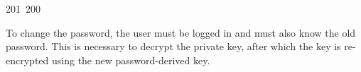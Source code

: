 201~200~\documentclass{article}
\begin{document}
	                                                                                                                                        To change the password, the user must be logged in and must also know the old password. This is necessary to decrypt the private key, after which the key is re-encrypted using the new password-derived key.

	                                                                                                                                        \begin{lstlisting}[language=Python, caption=Change Password]

	                                                                                                                                        def modify_password(user: User):
	                                                                                                                                            """
	                                                                                                                                                \brief Modify the password of a user.
	                                                                                                                                                    \param user The user whose password is to be modified.
	                                                                                                                                                        """
	                                                                                                                                                            old_password = get_input("Enter your old password")
	                                                                                                                                                                user_key = crypto.derive_user_key_from_password(user.username, old_password)
	                                                                                                                                                                    hashed_password = crypto.hash_user_key(user_key)

	                                                                                                                                                                        private_key = crypto.decrypt_private_key(user_key, User.getEncryptedPrivateKey(user), User.getNonce(user))


\end{lstlisting}
\end{document}
